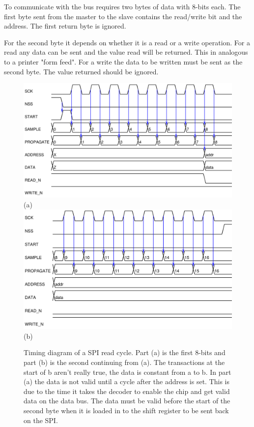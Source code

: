 \documentclass{article}
\begin{document}
To communicate with the bus requires two bytes of data with
8-bits each.
The first byte sent from the master to the slave
contains the read/write bit and the address.
The first return byte is ignored.

For the second byte it depends on whether it is a read or
a write operation.
For a read any data can be sent and the value read will be
returned.  This in analogous to a printer "form feed".
For a write the data to be written must be sent as the second
byte.
The value returned should be ignored.

\begin{figure}
\center
\includegraphics[scale=0.7]{figure/spi_ctl-timing/read-byte1} \\
(a) \\
\includegraphics[scale=0.7]{figure/spi_ctl-timing/read-byte2} \\
(b)
\caption{Timing diagram of a SPI read cycle.
Part (a) is the first 8-bits and part (b) is the second
continuing from (a).
The transactions at the start of b aren't really true,
the data is constant from a to b.
In part (a) the data is not valid until a cycle after the address
is set.
This is due to the time it takes the decoder to enable the chip and
get valid data on the data bus.
The data must be valid before the start of the second byte
when it is loaded in to the shift register to be sent back on the SPI.
}
\label{fig:spi_read}
\end{figure}
\end{document}
